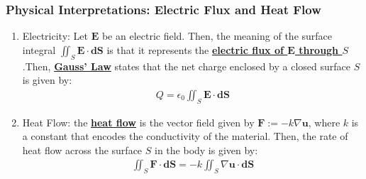 \documentclass[reqno,11pt]{amsart}
\theoremstyle{definition}
\theoremstyle{remark}
\newcommand{\dfn}[1]{\underline{\textbf{#1}}}
\begin{document}
\subsubsection{Physical Interpretations: Electric Flux and Heat Flow}
\begin{enumerate}
	\item Electricity: Let $\mathbf{E}$ be an electric field. Then, the meaning of the surface integral $\iint_S \mathbf{E} \cdot \mathbf{dS}$ is that it represents the \dfn{electric flux of $\mathbf{E}$ through $S$}.Then, \dfn{Gauss' Law} states that the net charge enclosed by a closed surface $S$ is given by:
	\begin{align}
		Q = \epsilon_0 \iint_S \mathbf{E} \cdot \mathbf{dS} 	
	\end{align}
	\item Heat Flow: the \dfn{heat flow} is the vector field given by $\mathbf{F} := - k \nabla \mathbf{u}$, where $k$ is a constant that encodes the conductivity of the material. Then, the rate of heat flow across the surface $S$ in the body is given by:
	\begin{align}
		\iint_S \mathbf{F} \cdot \mathbf{dS} = -k \iint_S \nabla \mathbf{u} \cdot \mathbf{dS} 	
	\end{align}

\end{enumerate}
%
%
%
%
\end{document}
